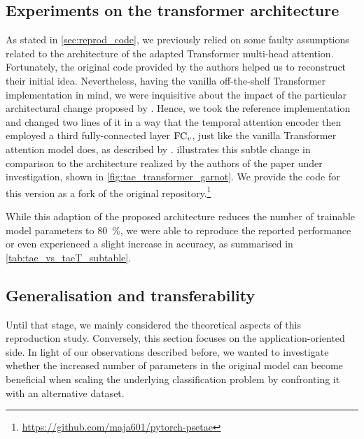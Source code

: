 \subsection{Experiments on the transformer architecture} \label{sec:transformer}

As stated in \cref{sec:reprod_code}, we previously relied on some faulty assumptions related to the architecture of the adapted Transformer multi-head attention.
Fortunately, the original code provided by the authors helped us to reconstruct their initial idea.
Nevertheless, having the vanilla off-the-shelf Transformer implementation in mind, we were inquisitive about the impact of the particular architectural change proposed by \citeauthor{Garnot20:SIT}.
Hence, we took the reference implementation and changed two lines of it in a way that the {temporal attention encoder} then employed a third fully-connected layer $\operatorname{FC}_v$, just like the vanilla Transformer attention model does, as described by \textcite{Vaswani17:Attention}.
 illustrates this subtle change in comparison to the architecture realized by the authors of the paper under investigation, shown in \cref{fig:tae_transformer_garnot}.
We provide the code for this version as a fork of the original repository.\footnote{\url{https://github.com/maja601/pytorch-psetae}}


\tabCompareTAECrossData
While this adaption of the proposed architecture reduces the number of trainable model parameters to \SI{80}{\percent}, we were able to reproduce the reported performance or even experienced a slight increase in accuracy, as summarised in \cref{tab:tae_vs_taeT_subtable}.


\subsection{Generalisation and transferability} \label{sec:generalisation}

Until that stage, we mainly considered the theoretical aspects of this reproduction study.
Conversely, this section focuses on the application-oriented side.
In light of our observations described before, we wanted to investigate whether the increased number of parameters in the original model can become beneficial when scaling the underlying classification problem by confronting it with an alternative dataset.


